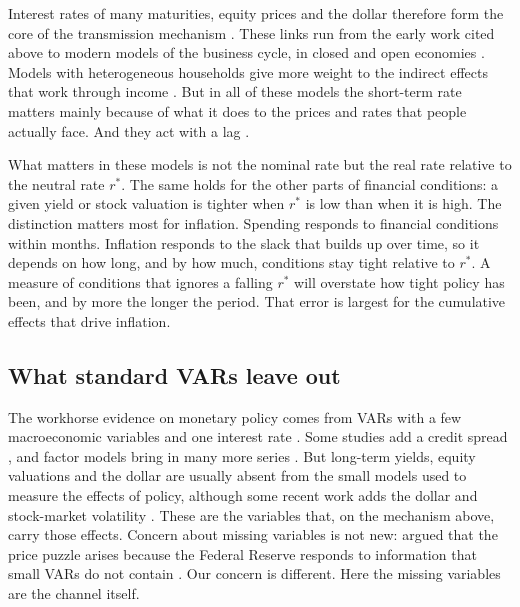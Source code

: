 \documentclass[11pt]{article}
\newcommand{\rs}{r^{*}}
\begin{document}
Interest rates of many maturities, equity prices and the dollar therefore form the core of the transmission mechanism \citep{boivin2010}. These links run from the early work cited above to modern models of the business cycle, in closed and open economies \citep{christiano2005,smets2007,gali2005}. Models with heterogeneous households give more weight to the indirect effects that work through income \citep{kaplan2018,auclert2019}. But in all of these models the short-term rate matters mainly because of what it does to the prices and rates that people actually face. And they act with a lag \citep{friedman1961}.

What matters in these models is not the nominal rate but the real rate relative to the neutral rate $\rs$. The same holds for the other parts of financial conditions: a given yield or stock valuation is tighter when $\rs$ is low than when it is high. The distinction matters most for inflation. Spending responds to financial conditions within months. Inflation responds to the slack that builds up over time, so it depends on how long, and by how much, conditions stay tight relative to $\rs$. A measure of conditions that ignores a falling $\rs$ will overstate how tight policy has been, and by more the longer the period. That error is largest for the cumulative effects that drive inflation.

\subsection{What standard VARs leave out}
The workhorse evidence on monetary policy comes from VARs with a few macroeconomic variables and one interest rate \citep{bernanke1992,christiano1999}. Some studies add a credit spread \citep{gertler2015,caldara2019}, and factor models bring in many more series \citep{bernanke2005favar}. But long-term yields, equity valuations and the dollar are usually absent from the small models used to measure the effects of policy, although some recent work adds the dollar and stock-market volatility \citep{boehm2026}. These are the variables that, on the mechanism above, carry those effects. Concern about missing variables is not new: \citet{sims1992} argued that the price puzzle arises because the Federal Reserve responds to information that small VARs do not contain \citep[see also][]{castelnuovo2010}. Our concern is different. Here the missing variables are the channel itself.
\end{document}
